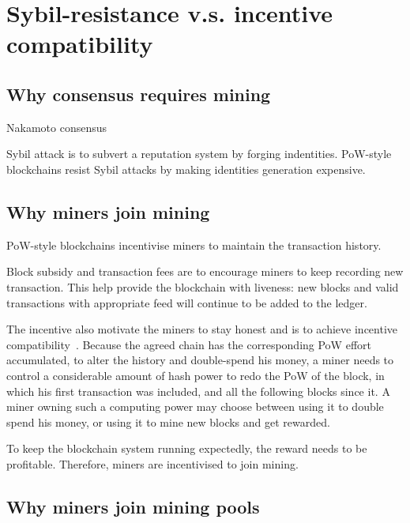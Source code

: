 \section{Sybil-resistance v.s. incentive compatibility}

\subsection{Why consensus requires mining}
Nakamoto consensus

Sybil attack is to subvert a reputation system by forging indentities.
PoW-style blockchains resist Sybil attacks by making identities generation expensive.

\subsection{Why miners join mining}

PoW-style blockchains incentivise miners to maintain the transaction history.

Block subsidy and transaction fees are to encourage miners to keep recording new transaction.
This help provide the blockchain with liveness: new blocks and valid transactions with appropriate feed will continue to be added to the ledger.

The incentive also motivate the miners to stay honest and is to achieve incentive compatibility~\cite{}.
Because the agreed chain has the corresponding PoW effort accumulated, to alter the history and double-spend his money, a miner needs to control a considerable amount of hash power to redo the PoW of the block, in which his first transaction was included, and all the following blocks since it.
A miner owning such a computing power may choose between using it to double spend his money, or using it to mine new blocks and get rewarded. 

To keep the blockchain system running expectedly, the reward needs to be profitable.
Therefore, miners are incentivised to join mining.

\subsection{Why miners join mining pools}



